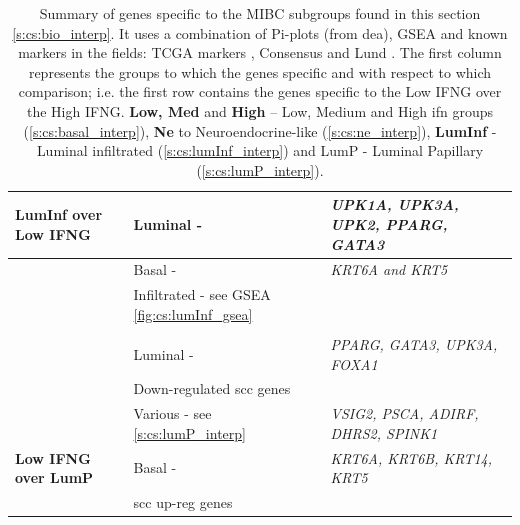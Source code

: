\begin{table}[!htb]
\begin{tabularx}{\textwidth}{>{\hsize=0.8\hsize}X|>{\hsize=1.1\hsize}X|>{\hsize=1.1\hsize}X}
    \midrule  
    \textbf{LumInf over Low IFNG} & Luminal - \citep{Robertson2017-mg} & \textit{UPK1A, UPK3A, UPK2, PPARG, GATA3} \\
    \midrule
    \multirow{2}{=}{\parbox[t]{\hsize}{\textbf{Low IFNG over LumInf}}} & Basal - \citep{Robertson2017-mg} & \textit{KRT6A and KRT5} \\
    \cmidrule{2-3}
    & Infiltrated - see GSEA \cref{fig:cs:lumInf_gsea} & \\
    \midrule
    \multicolumn{3}{c}{\textbf{LumP - \cref{fig:cs:lumP_pi}}} \\
    \midrule  
    \multirow{3}{*}{\textbf{LumP}} & Luminal - \cite{Robertson2017-mg} & \textit{PPARG, GATA3, UPK3A, FOXA1} \\
    \cmidrule{2-3}
    & Down-regulated \acrshort{scc} genes \cite{Hurst2022-sp} & \\
    \cmidrule{2-3}
    & Various - see \cref{s:cs:lumP_interp} & \textit{VSIG2, PSCA, ADIRF, DHRS2, SPINK1} \\
    \midrule
    \textbf{Low IFNG over LumP} & Basal - \cite{Robertson2017-mg} & \textit{KRT6A, KRT6B, KRT14, KRT5} \\
    \midrule
    & \acrshort{scc} up-reg genes \citet{Hurst2022-sp} & \\
    \bottomrule
  \end{tabularx}
  \caption[Summary of the genes found across the DEAs]{Summary of genes specific to the MIBC subgroups found in this section \cref{s:cs:bio_interp}. It uses a combination of Pi-plots (from \acrshort{dea}), GSEA and known markers in the fields: TCGA markers \citet{Robertson2017-mg}, Consensus \citet{Kamoun2020-tj} and Lund \citet{Marzouka2018-ge}. The first column represents the groups to which the genes specific and with respect to which comparison; i.e. the first row contains the genes specific to the Low IFNG over the High IFNG. \textbf{Low, Med} and \textbf{High} -- Low, Medium and High \acrlong{ifn} groups (\cref{s:cs:basal_interp}), \textbf{Ne} to Neuroendocrine-like (\cref{s:cs:ne_interp}), \textbf{LumInf} - Luminal infiltrated (\cref{s:cs:lumInf_interp}) and LumP - Luminal Papillary (\cref{s:cs:lumP_interp}).   }
  \label{tab:cs:genes_summaries}
\end{table}


